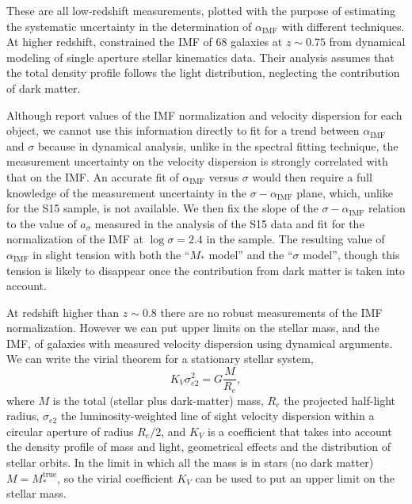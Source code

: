 \documentclass[usenatbib]{mnras}
\def\mtrue{M_*^{\mathrm{true}}}
\def\aimf{\alpha_{\mathrm{IMF}}}
\begin{document}
These are all low-redshift measurements, plotted with the purpose of
estimating the systematic uncertainty in the determination of $\aimf$
with different techniques.  At higher redshift, \citet{S+C14}
constrained the IMF of 68 galaxies at $z\sim0.75$ from dynamical
modeling of single aperture stellar kinematics data. 
Their analysis assumes that the total
density profile follows the light distribution, neglecting the
contribution of dark matter.

Although \citet{S+C14} report values of the IMF normalization and
velocity dispersion for each object, we cannot use this information
directly to fit for a trend between $\aimf$ and $\sigma$ because in
dynamical analysis, unlike in the spectral fitting technique, the
measurement uncertainty on the velocity dispersion is strongly
correlated with that on the IMF.  An accurate fit of
$\aimf$ versus $\sigma$ would then require a full knowledge of the
measurement uncertainty in the $\sigma-\aimf$ plane, which, unlike for the S15 sample, is not
available.  We then fix the slope of the $\sigma-\aimf$ relation to
the value of $a_\sigma$ measured in the analysis of the S15 data and fit for the
normalization of the IMF at $\log{\sigma}=2.4$ in the \citet{S+C14}
sample.  The resulting value of $\aimf$ in slight tension with both the ``$M_*$ model'' and the ``$\sigma$ model'', though this
tension is likely to disappear once the contribution from dark matter
is taken into account.

At redshift higher than $z\sim0.8$ there are no robust measurements of
the IMF normalization.  However we can put upper limits on the stellar
mass, and the IMF, of galaxies with measured velocity dispersion using
dynamical arguments.  We can write the virial theorem for a stationary
stellar system,
\begin{equation}\label{eq:virial}
K_V\sigma_{e2}^2 = G\frac{M}{R_e},
\end{equation}
where $M$ is the total (stellar plus dark-matter) mass, $R_e$ the
projected half-light radius, $\sigma_{e2}$ the luminosity-weighted
line of sight velocity dispersion within a circular aperture of radius
$R_e/2$, and $K_V$ is a coefficient that takes into account the
density profile of mass and light, geometrical effects and the
distribution of stellar orbits.  In the limit in which all the
  mass is in stars (no dark matter) $M=\mtrue$, so the virial
  coefficient $K_V$ can be used to put an upper limit on the stellar
  mass.
\end{document}
